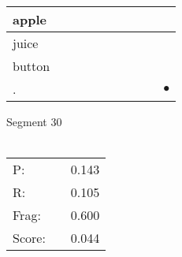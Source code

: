\documentclass[landscape]{article}
\newcommand{\ssp}{\hspace{2pt}}
\newcommand{\mex}{\cellcolor{g}$\bullet$}
\begin{document}
\begin{tabular}{|l|p{10pt}|p{10pt}|p{10pt}|p{10pt}|p{10pt}|p{10pt}|p{10pt}|p{10pt}|p{10pt}|}
\hline
\ssp apple \ssp&\hspace{2pt}&\hspace{2pt}&\hspace{2pt}&\hspace{2pt}&\hspace{2pt}&\hspace{2pt}&\hspace{2pt}&\hspace{2pt}&\hspace{2pt}\\
\hline
\ssp juice \ssp&\hspace{2pt}&\hspace{2pt}&\hspace{2pt}&\hspace{2pt}&\hspace{2pt}&\hspace{2pt}&\hspace{2pt}&\hspace{2pt}&\hspace{2pt}\\
\hline
\ssp button \ssp&\hspace{2pt}&\hspace{2pt}&\hspace{2pt}&\hspace{2pt}&\hspace{2pt}&\hspace{2pt}&\hspace{2pt}&\hspace{2pt}&\hspace{2pt}\\
\hline
\ssp \cellcolor{ref8}. \ssp&\hspace{2pt}&\hspace{2pt}&\hspace{2pt}&\hspace{2pt}&\hspace{2pt}&\hspace{2pt}&\hspace{2pt}&\hspace{2pt}&\hspace{2pt}\mex\\
\hline
\end{tabular}

\vspace{6pt}
\noindent Segment 30\\\\
\noindent\begin{tabular}{lm{12pt}r}
\hline
P:&&0.143\\
R:&&0.105\\
Frag:&&0.600\\
Score:&&0.044\\
\end{tabular}
\end{document}
